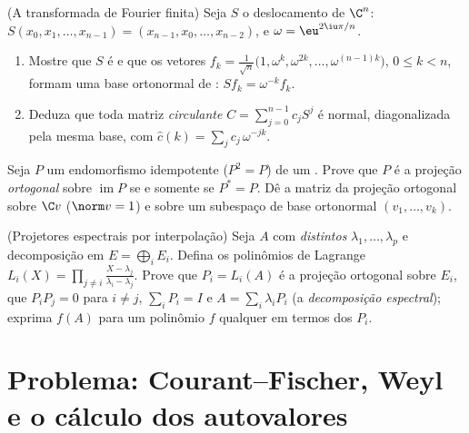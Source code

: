 \begin{exercise}[$\star\star$]\label{exo:b2:hermitian:10}
(A transformada de Fourier finita) Seja $S$ o deslocamento  de
$\C^n$: $S(x_0, x_1, \dots, x_{n-1}) = (x_{n-1}, x_0, \dots,
x_{n-2})$, e $\omega = \eu^{2\iu\pi/n}$.
\begin{enumerate}
  \item Mostre que $S$ é  e que os vetores $f_k =
        \frac{1}{\sqrt n}\bigl(1, \omega^k, \omega^{2k}, \dots,
        \omega^{(n-1)k}\bigr)$, $0 \leq k < n$, formam uma
        base ortonormal de : $Sf_k = \omega^{-k}
        f_k$.
  \item Deduza que toda matriz \emph{circulante} $C =
        \sum_{j=0}^{n-1} c_jS^j$ é normal, diagonalizada pela
        mesma base, com  $\widehat c(k) = \sum_j
        c_j\,\omega^{-jk}$.
\end{enumerate}
\end{exercise}

\begin{exercise}[$\star\star$]\label{exo:b2:hermitian:11}
Seja $P$ um endomorfismo idempotente ($P^2 = P$) de um . Prove que $P$ é a projeção \emph{ortogonal} sobre
$\operatorname{im} P$ se e somente se $P^* = P$. Dê a matriz
da projeção ortogonal sobre $\C v$ ($\norm v = 1$) e
sobre um subespaço de base ortonormal $(v_1, \dots, v_k)$.
\end{exercise}

\begin{exercise}[$\star\star\star$]\label{exo:b2:hermitian:12}
(Projetores espectrais por interpolação) Seja $A$  com
 \emph{distintos} $\lambda_1, \dots, \lambda_p$ e
decomposição em  $E = \bigoplus_i E_i$. Defina os
polinômios de Lagrange $L_i(X) = \prod_{j\neq i}\frac{X -
\lambda_j}{\lambda_i - \lambda_j}$. Prove que $P_i = L_i(A)$
é a projeção ortogonal sobre $E_i$, que $P_iP_j = 0$ para
$i \neq j$, $\sum_i P_i = I$ e $A = \sum_i \lambda_iP_i$
(a \emph{decomposição espectral}); exprima $f(A)$ para um polinômio
$f$ qualquer em termos dos $P_i$.
\end{exercise}

\section{Problema: Courant--Fischer, Weyl e o cálculo dos
autovalores}

